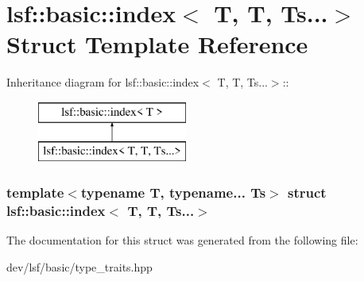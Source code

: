 \hypertarget{structlsf_1_1basic_1_1index_3_01T_00_01T_00_01Ts_8_8_8_4}{
\section{lsf::basic::index$<$ T, T, Ts...$>$ Struct Template Reference}
\label{structlsf_1_1basic_1_1index_3_01T_00_01T_00_01Ts_8_8_8_4}
}
Inheritance diagram for lsf::basic::index$<$ T, T, Ts...$>$::\begin{figure}[H]
\begin{center}
\leavevmode
\includegraphics[height=2cm]{structlsf_1_1basic_1_1index_3_01T_00_01T_00_01Ts_8_8_8_4}
\end{center}
\end{figure}
\subsubsection*{template$<$typename T, typename... Ts$>$ struct lsf::basic::index$<$ T, T, Ts...$>$}



The documentation for this struct was generated from the following file:\begin{DoxyCompactItemize}
\item 
dev/lsf/basic/type\_\-traits.hpp\end{DoxyCompactItemize}
